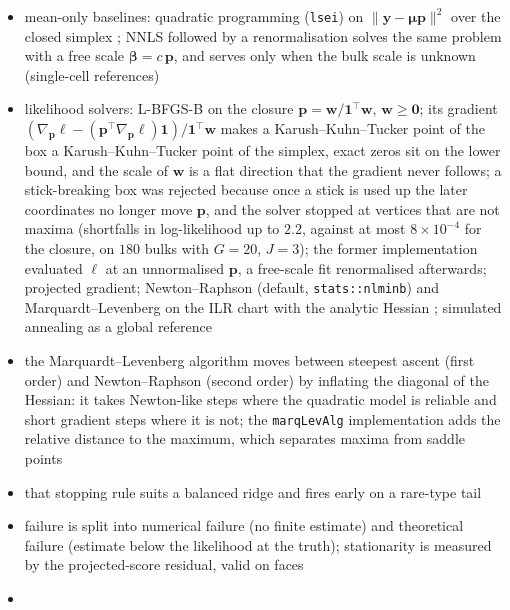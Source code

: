 \begin{itemize}
  \item mean-only baselines: quadratic programming (\texttt{lsei}) on \(\|\boldsymbol{y}-\boldsymbol{\mu}\boldsymbol{p}\|^{2}\) over the
        closed simplex \cite{gongDeconRNASeqStatisticalFramework2013}; NNLS followed by a renormalisation
        \cite{dessoleLawsonHansonAlgorithmDeviation2023} solves the same problem with a free scale
        \(\boldsymbol{\beta}=c\,\boldsymbol{p}\), and serves only when the bulk scale is unknown (single-cell references)
  \item likelihood solvers: L-BFGS-B \cite{byrdLimitedMemoryAlgorithm1995} on the closure
        \(\boldsymbol{p}=\boldsymbol{w}/\mathbf{1}^{\top}\boldsymbol{w}\), \(\boldsymbol{w}\ge\mathbf{0}\); its gradient
        \((\nabla_{\boldsymbol{p}}\ell-(\boldsymbol{p}^{\top}\nabla_{\boldsymbol{p}}\ell)\mathbf{1})/\mathbf{1}^{\top}\boldsymbol{w}\) makes a
        Karush--Kuhn--Tucker point of the box a Karush--Kuhn--Tucker point of the simplex, exact zeros sit on the lower
        bound, and the scale of \(\boldsymbol{w}\) is a flat direction that the gradient never follows; a stick-breaking
        box was rejected because once a stick is used up the later coordinates no longer move \(\boldsymbol{p}\), and
        the solver stopped at vertices that are not maxima (shortfalls in log-likelihood up to \(2.2\), against at
        most \(8\times10^{-4}\) for the closure, on \(180\) bulks with \(G=20\), \(J=3\)); the former implementation
        evaluated \(\ell\) at an unnormalised \(\boldsymbol{p}\), a free-scale fit renormalised afterwards;
        projected gradient; Newton--Raphson (default, \texttt{stats::nlminb}) and Marquardt--Levenberg on the ILR
        chart with the analytic Hessian
        \cite{marquardtAlgorithmLeastSquaresEstimation1963,commengesNewtonLikeAlgorithmLikelihood2006,philippsRobustEfficientOptimization2021};
        simulated annealing as a global reference
  \item the Marquardt--Levenberg algorithm \cite{marquardtAlgorithmLeastSquaresEstimation1963} moves between
        steepest ascent (first order) and Newton--Raphson (second order) by inflating the diagonal of the
        Hessian: it takes Newton-like steps where the quadratic model is reliable and short gradient steps
        where it is not; the \texttt{marqLevAlg} implementation adds the relative distance to the maximum,
        which separates maxima from saddle points \cite{philippsRobustEfficientOptimization2021}
  \item that stopping rule suits a balanced ridge and fires early on a rare-type tail
  \item failure is split into numerical failure (no finite estimate) and theoretical failure (estimate below the
        likelihood at the truth); stationarity is measured by the projected-score residual, valid on faces
  \item[] 
\end{itemize}

